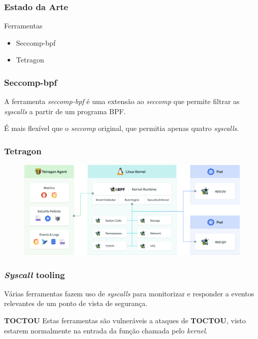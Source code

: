 \documentclass[pdflatex,compress]{beamer}
\begin{document}
\begin{frame}
\frametitle{Estado da Arte}

\begin{exampleblock}{Ferramentas}
    \begin{itemize}
        \pause
        \item Seccomp-bpf
        \pause
        \item Tetragon
    \end{itemize}
\end{exampleblock}

\end{frame}


\begin{frame}
\frametitle{Seccomp-bpf}

A ferramenta \emph{seccomp-bpf} é uma extensão ao \emph{seccomp} que permite filtrar as \emph{syscalls} a partir de um programa BPF.

É mais flexível que o \emph{seccomp} original, que permitia apenas quatro \emph{syscalls}.  


\end{frame}


\begin{frame}
\frametitle{Tetragon}


\begin{figure}[x]
\includegraphics[scale=0.15]{images/tetragon.png}
\centering
\end{figure}

\end{frame}

\begin{frame}
\frametitle{\emph{Syscall} tooling}

Várias ferramentas fazem uso de \emph{syscalls} para monitorizar e responder a eventos relevantes de um ponto de vista de segurança. 

\pause
\begin{alertblock}{\textbf{TOCTOU}}
    Estas ferramentas são vulneráveis a ataques de \textbf{TOCTOU}, visto estarem normalmente na entrada da função chamada pelo \emph{kernel}.
\end{alertblock}


\end{frame}
\end{document}
